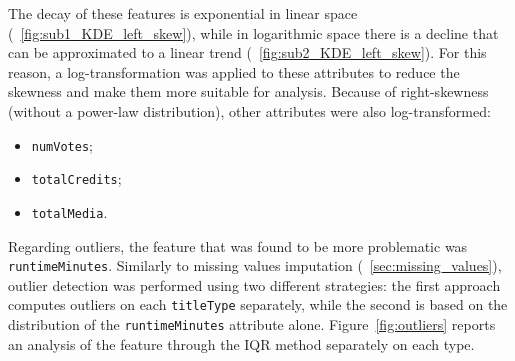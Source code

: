 The decay of these features is exponential in linear space (~\ref{fig:sub1_KDE_left_skew}), while in logarithmic space there is a decline that can be approximated to a linear trend (~\ref{fig:sub2_KDE_left_skew}). 
For this reason, a log-transformation was applied to these attributes to reduce the skewness and make them more suitable for analysis.
Because of right-skewness (without a power-law distribution), other attributes were also log-transformed:
\begin{itemize}
    \item \texttt{numVotes};
    \item \texttt{totalCredits};
    \item \texttt{totalMedia}.
\end{itemize}


Regarding outliers, the feature that was found to be more problematic was \texttt{runtimeMinutes}.
Similarly to missing values imputation (~\ref{sec:missing_values}),
outlier detection was performed using two different strategies:
the first approach computes outliers on each \texttt{titleType} separately,
while the second is based on the distribution of the \texttt{runtimeMinutes} attribute alone.
Figure~\ref{fig:outliers} reports an analysis of the feature through the IQR method separately on each type.

